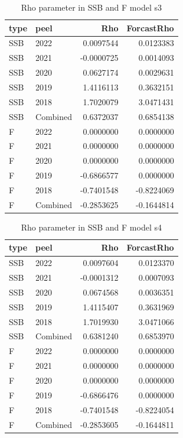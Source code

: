 \documentclass[
]{article}
\begin{document}
\begin{table}[H]

\caption{\label{tab:unnamed-chunk-14}\label{mod3}Rho parameter in SSB  and F model s3}
\centering
\begin{tabular}[t]{llrr}
\toprule
type & peel & Rho & ForcastRho\\
\midrule
SSB & 2022 & 0.0097544 & 0.0123383\\
SSB & 2021 & -0.0000725 & 0.0014093\\
SSB & 2020 & 0.0627174 & 0.0029631\\
SSB & 2019 & 1.4116113 & 0.3632151\\
SSB & 2018 & 1.7020079 & 3.0471431\\
\addlinespace
SSB & Combined & 0.6372037 & 0.6854138\\
F & 2022 & 0.0000000 & 0.0000000\\
F & 2021 & 0.0000000 & 0.0000000\\
F & 2020 & 0.0000000 & 0.0000000\\
F & 2019 & -0.6866577 & 0.0000000\\
\addlinespace
F & 2018 & -0.7401548 & -0.8224069\\
F & Combined & -0.2853625 & -0.1644814\\
\bottomrule
\end{tabular}
\end{table}

\begin{table}[H]

\caption{\label{tab:unnamed-chunk-14}\label{mod4}Rho parameter in SSB  and F model s4}
\centering
\begin{tabular}[t]{llrr}
\toprule
type & peel & Rho & ForcastRho\\
\midrule
SSB & 2022 & 0.0097604 & 0.0123370\\
SSB & 2021 & -0.0001312 & 0.0007093\\
SSB & 2020 & 0.0674568 & 0.0036351\\
SSB & 2019 & 1.4115407 & 0.3631969\\
SSB & 2018 & 1.7019930 & 3.0471066\\
\addlinespace
SSB & Combined & 0.6381240 & 0.6853970\\
F & 2022 & 0.0000000 & 0.0000000\\
F & 2021 & 0.0000000 & 0.0000000\\
F & 2020 & 0.0000000 & 0.0000000\\
F & 2019 & -0.6866476 & 0.0000000\\
\addlinespace
F & 2018 & -0.7401548 & -0.8224054\\
F & Combined & -0.2853605 & -0.1644811\\
\bottomrule
\end{tabular}
\end{table}
\end{document}
